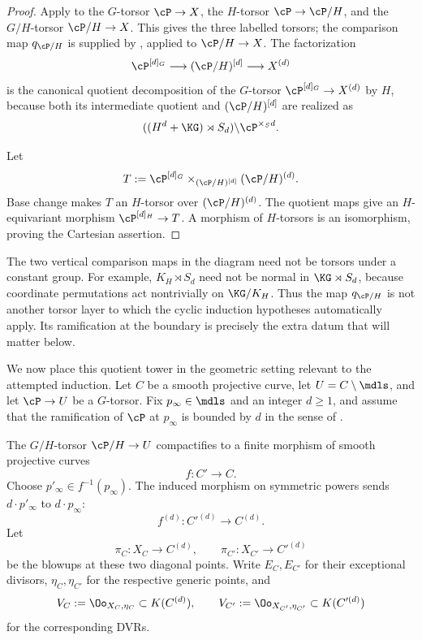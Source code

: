 \begin{proof}
Apply  to the $G$-torsor $\cP\to X$, the
$H$-torsor $\cP\to\cP/H$, and the $G/H$-torsor $\cP/H\to X$. This gives the
three labelled torsors; the comparison map $q_{\cP/H}$ is supplied by
, applied to
$\cP/H\to X$. The factorization
\[
\cP^{[d]_G}\longrightarrow(\cP/H)^{[d]}\longrightarrow X^{(d)}
\]
is the canonical quotient decomposition of the $G$-torsor
$\cP^{[d]_G}\to X^{(d)}$ by $H$, because both its intermediate quotient and
$(\cP/H)^{[d]}$ are realized as
\[
((H^d+\KG)\rtimes S_d)\backslash\cP^{\times_S d}.
\]

Let
\[
T:=\cP^{[d]_G}\times_{(\cP/H)^{[d]}}(\cP/H)^{(d)}.
\]
Base change makes $T$ an $H$-torsor over $(\cP/H)^{(d)}$. The quotient maps
give an $H$-equivariant morphism $\cP^{[d]_H}\to T$. A morphism of
$H$-torsors is an isomorphism, proving the Cartesian assertion.
\end{proof}

\begin{rem*}
The two vertical comparison maps in the diagram need not be torsors under a
constant group. For example, $K_H\rtimes S_d$ need not be normal in
$\KG\rtimes S_d$, because coordinate permutations act nontrivially on
$\KG/K_H$. Thus the map $q_{\cP/H}$ is not another torsor layer to which the cyclic
induction hypotheses automatically apply. Its ramification at the boundary
is precisely the extra datum that will matter below.
\end{rem*}

We now place this quotient tower in the geometric setting relevant to the
attempted induction.
Let $C$ be a smooth projective curve, let $U=C\setminus\mdls$, and let
$\cP\to U$ be a $G$-torsor. Fix $p_\infty\in\mdls$ and an integer $d\geq1$,
and assume that the ramification of $\cP$ at $p_\infty$ is bounded by $d$ in
the sense of .

The $G/H$-torsor $\cP/H\to U$ compactifies to a finite morphism of smooth
projective curves
\[
f:C'\longrightarrow C.
\]
Choose $p'_\infty\in f^{-1}(p_\infty)$. The induced morphism on symmetric
powers sends $d\cdot p'_\infty$ to $d\cdot p_\infty$:
\[
f^{(d)}:C'^{(d)}\longrightarrow C^{(d)}.
\]
Let
\[
\pi_C:X_C\longrightarrow C^{(d)},\qquad
\pi_{C'}:X_{C'}\longrightarrow C'^{(d)}
\]
be the blowups at these two diagonal points. Write $E_C,E_{C'}$ for their
exceptional divisors, $\eta_C,\eta_{C'}$ for the respective generic points,
and
\[
V_C:=\Oo_{X_C,\eta_C}\subset K(C^{(d)}),\qquad
V_{C'}:=\Oo_{X_{C'},\eta_{C'}}\subset K(C'^{(d)})
\]
for the corresponding DVRs.

